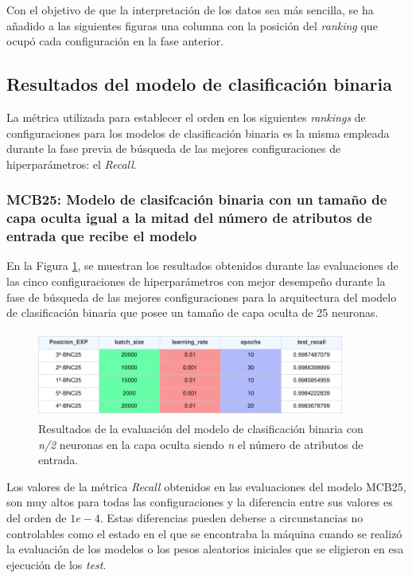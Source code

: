Con el objetivo de que la interpretación de los datos sea más sencilla, se ha añadido a las siguientes figuras una columna con la posición del \textit{ranking} que ocupó cada configuración en la fase anterior.




\subsection{Resultados del modelo de clasificación binaria}
La métrica utilizada para establecer el orden en los siguientes \textit{rankings} de configuraciones para los modelos de clasificación binaria es la misma empleada durante la fase previa de búsqueda de las mejores configuraciones de hiperparámetros: el \textit{Recall}.

\subsubsection{MCB25: Modelo de clasifcación binaria con un tamaño de capa oculta igual a la mitad del número de atributos de entrada que recibe el modelo}
En la Figura \ref{fig:EVALMCB25}, se muestran los resultados obtenidos durante las evaluaciones de las cinco configuraciones de hiperparámetros con mejor desempeño durante la fase de búsqueda de las mejores configuraciones para la arquitectura del modelo de clasificación binaria que posee un tamaño de capa oculta de 25 neuronas.

\begin{figure}[H]
    \centering
    \includegraphics[width=0.9\textwidth]{./img/evaluacion/resultados/EVALMCB25.pdf}
    \caption{Resultados de la evaluación del modelo de  clasificación binaria con \textit{n/2} neuronas en la capa oculta siendo \textit{n} el número de atributos de entrada.}
    \label{fig:EVALMCB25}
\end{figure}

Los valores de la métrica \textit{Recall} obtenidos en las evaluaciones del modelo MCB25, son muy altos para todas las configuraciones y la diferencia entre sus valores es del orden de $1e-4$. Estas diferencias pueden deberse a circunstancias no controlables como el estado en el que se encontraba la máquina cuando se realizó la evaluación de los modelos o los pesos aleatorios iniciales que se eligieron en esa ejecución de los \textit{test}.

